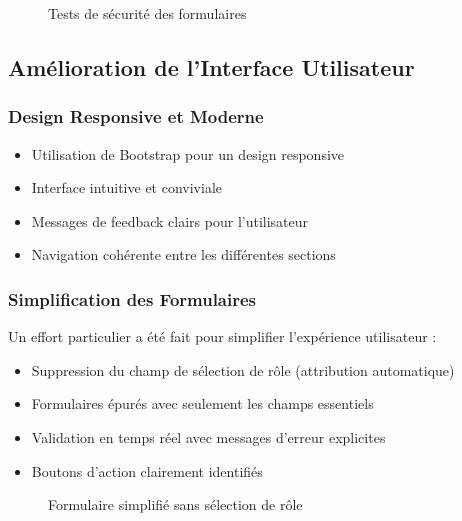 \documentclass[12pt,a4paper]{article}
\begin{document}
\begin{figure}[H]
    \centering
    \caption{Tests de sécurité des formulaires}
    \label{fig:test_securite_formulaires}
\end{figure}

\subsection{Amélioration de l'Interface Utilisateur}

\subsubsection{Design Responsive et Moderne}
\begin{itemize}
    \item Utilisation de Bootstrap pour un design responsive
    \item Interface intuitive et conviviale
    \item Messages de feedback clairs pour l'utilisateur
    \item Navigation cohérente entre les différentes sections
\end{itemize}

\subsubsection{Simplification des Formulaires}
Un effort particulier a été fait pour simplifier l'expérience utilisateur :

\begin{itemize}
    \item Suppression du champ de sélection de rôle (attribution automatique)
    \item Formulaires épurés avec seulement les champs essentiels
    \item Validation en temps réel avec messages d'erreur explicites
    \item Boutons d'action clairement identifiés
\end{itemize}

\begin{figure}[H]
    \centering
    \caption{Formulaire simplifié sans sélection de rôle}
    \label{fig:formulaire_simplifie}
\end{figure}
\end{document}
